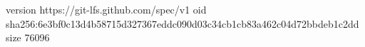 version https://git-lfs.github.com/spec/v1
oid sha256:6e3bf0c13d4b58715d327367eddc090d03c34cb1cb83a462c04d72bbdeb1c2dd
size 76096
